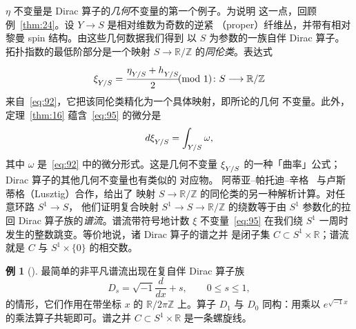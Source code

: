 \documentclass[11pt]{amsart}
\theoremstyle{definition}
\newtheorem{example}[equation]{例}
\theoremstyle{remark}
\theoremstyle{plain}
\numberwithin{equation}{section}
\renewcommand{\:}{\colon}
\newcommand{\RR}{{\mathbb R}}
\newcommand{\ZZ}{{\mathbb Z}}
\newcommand{\cir}{S^1}
\DeclareRobustCommand{\mstrut}{^{\vphantom{1*\prime y\vee M}}}
\newcommand{\RZ}{\RR/\ZZ}
\newcommand{\et}[1]{\eta \mstrut _{#1}}
\newcommand{\xia}[1]{\xi \mstrut _{#1}}
\begin{document}
$\eta$ 不变量是 Dirac 算子的\emph{几何}不变量的第一个例子。为说明
这一点，回顾例~\ref{thm:24}。设 $Y\to S$ 是相对维数为奇数的逆紧
（proper）纤维丛，并带有相对黎曼 spin 结构。由这些几何数据我们得到
以 $S$ 为参数的一族自伴 Dirac 算子。拓扑指数的最低阶部分是一个映射
$S\to\RZ$ 的\emph{同伦类}。表达式
  \begin{equation}\label{eq:95}
     \xia{Y/S} = \frac{\et{Y/S} + h\mstrut _{Y/S}}{2}\!\!\!\!\pmod1\:S\longrightarrow \RZ 
  \end{equation}
来自~\eqref{eq:92}，它把该同伦类精化为一个具体映射，即所论的几何
不变量。此外，定理~\ref{thm:16} 蕴含~\eqref{eq:95} 的微分是
  \begin{equation}\label{eq:96}
     d\xia{Y/S} = \int_{Y/S}\omega , 
  \end{equation}
其中 $\omega$ 是~\eqref{eq:92} 中的微分形式。这是几何不变量
$\xia{Y/S}$ 的一种「曲率」公式；Dirac 算子的其他几何不变量也有类似的
对应物。
阿蒂亚–帕托迪–辛格~\cite[\S7]{APS3} 与卢斯蒂格（Lusztig）合作，给出了
映射 $S\to\RZ$ 的同伦类的另一种解析计算。对任意环路 $\cir\to S$，
他们证明复合映射 $\cir\to S\to \RZ$ 的绕数等于由 $\cir$ 参数化的拉回
Dirac 算子族的\emph{谱流}。谱流带符号地计数 $\xi$ 不变量~\eqref{eq:95}
在我们绕 $\cir$ 一周时发生的整数跳变。等价地说，诸 Dirac 算子的谱之并
是闭子集 $C \subset \cir\times \RR$；谱流就是 $C$ 与 $\cir\times \{0\}$
的相交数。
  \begin{example}[]\label{thm:25}
 最简单的非平凡谱流出现在复自伴 Dirac 算子族
  \begin{equation}\label{eq:100}
     D_s = \sqrt{-1} \frac{d}{dx} + s,\qquad 0\le s\le 1, 
  \end{equation}
的情形，它们作用在带坐标 $x$ 的 $\RR/2\pi \ZZ$ 上。算子 $D_1$ 与 $D_0$
同构：用乘以 $e^{\sqrt{-1}x}$ 的乘法算子共轭即可。谱之并
$C\subset \cir\times \RR$ 是一条螺旋线。
  \end{example}
\end{document}
